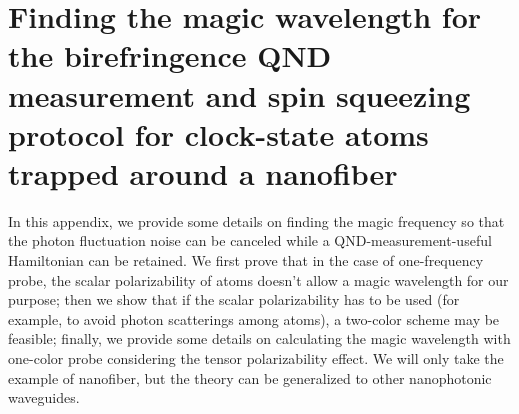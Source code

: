 \chapter[Finding the magic wavelength for the birefringence protocol]{Finding the magic wavelength for the birefringence QND measurement and spin squeezing protocol for clock-state atoms trapped around a nanofiber}\label{chap:magicwavelength}
In this appendix, we provide some details on finding the magic frequency so that the photon fluctuation noise can be canceled while a QND-measurement-useful Hamiltonian can be retained. We first prove that in the case of one-frequency probe, the scalar polarizability of atoms doesn't allow a magic wavelength for our purpose; then we show that if the scalar polarizability has to be used (for example, to avoid photon scatterings among atoms), a two-color scheme may be feasible; finally, we provide some details on calculating the magic wavelength with one-color probe considering the tensor polarizability effect. We will only take the example of nanofiber, but the theory can be generalized to other nanophotonic waveguides.

